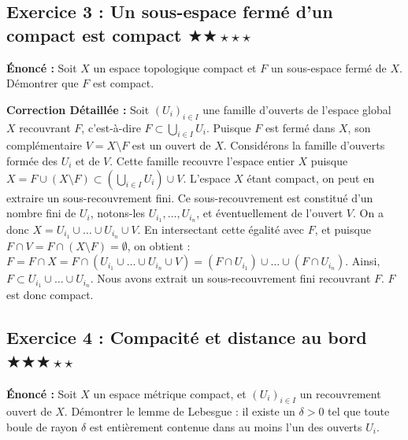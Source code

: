 \documentclass[11pt,a4paper]{article}
\begin{document}
\subsection*{Exercice 3 : Un sous-espace fermé d'un compact est compact \quad $\bigstar\bigstar\star\star\star$}

\textbf{Énoncé :} Soit $X$ un espace topologique compact et $F$ un sous-espace fermé de $X$. Démontrer que $F$ est compact.

\textbf{Correction Détaillée :}
Soit $(U_i)_{i \in I}$ une famille d'ouverts de l'espace global $X$ recouvrant $F$, c'est-à-dire $F \subset \bigcup_{i \in I} U_i$.
Puisque $F$ est fermé dans $X$, son complémentaire $V = X \setminus F$ est un ouvert de $X$.
Considérons la famille d'ouverts formée des $U_i$ et de $V$. Cette famille recouvre l'espace entier $X$ puisque $X = F \cup (X \setminus F) \subset \left(\bigcup_{i \in I} U_i\right) \cup V$.
L'espace $X$ étant compact, on peut en extraire un sous-recouvrement fini. Ce sous-recouvrement est constitué d'un nombre fini de $U_i$, notons-les $U_{i_1}, \dots, U_{i_n}$, et éventuellement de l'ouvert $V$.
On a donc $X = U_{i_1} \cup \dots \cup U_{i_n} \cup V$.
En intersectant cette égalité avec $F$, et puisque $F \cap V = F \cap (X \setminus F) = \emptyset$, on obtient :
$F = F \cap X = F \cap (U_{i_1} \cup \dots \cup U_{i_n} \cup V) = (F \cap U_{i_1}) \cup \dots \cup (F \cap U_{i_n})$.
Ainsi, $F \subset U_{i_1} \cup \dots \cup U_{i_n}$.
Nous avons extrait un sous-recouvrement fini recouvrant $F$. $F$ est donc compact.

\subsection*{Exercice 4 : Compacité et distance au bord \quad $\bigstar\bigstar\bigstar\star\star$}

\textbf{Énoncé :} Soit $X$ un espace métrique compact, et $(U_i)_{i \in I}$ un recouvrement ouvert de $X$. Démontrer le lemme de Lebesgue : il existe un $\delta > 0$ tel que toute boule de rayon $\delta$ est entièrement contenue dans au moins l'un des ouverts $U_i$.
\end{document}
